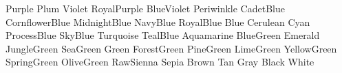 \newColor Purple	  %
\newColor Plum		  %
\newColor Violet	  %
\newColor RoyalPurple	  %
\newColor BlueViolet	  %
\newColor Periwinkle	  %
\newColor CadetBlue	  %
\newColor CornflowerBlue  %
\newColor MidnightBlue	  %
\newColor NavyBlue	  %
\newColor RoyalBlue	  %
\newColor Blue		  %
\newColor Cerulean	  %
\newColor Cyan		  %
\newColor ProcessBlue	  %
\newColor SkyBlue	  %
\newColor Turquoise	  %
\newColor TealBlue	  %
\newColor Aquamarine	  %
\newColor BlueGreen	  %
\newColor Emerald	  %
\newColor JungleGreen	  %
\newColor SeaGreen	  %
\newColor Green		  %
\newColor ForestGreen	  %
\newColor PineGreen	  %
\newColor LimeGreen	  %
\newColor YellowGreen	  %
\newColor SpringGreen	  %
\newColor OliveGreen	  %
\newColor RawSienna	  %
\newColor Sepia		  %
\newColor Brown		  %
\newColor Tan		  %
\newColor Gray		  %
\newColor Black		  %
\newColor White		  %
